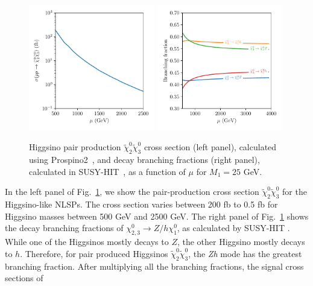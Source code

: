 \documentclass[a4paper,11pt]{article}
\newcommand{\N}{\widetilde{\chi}^0}
\begin{document}
\begin{figure}[h]
  \centering
  \includegraphics[width=0.49\textwidth]{images/xsection_plot.pdf}
  \includegraphics[width=0.49\textwidth]{images/br_plot.pdf}
  \caption{Higgsino pair production $\N_2\N_3$
    cross section (left panel), calculated using
    Prospino2~\cite{Beenakker:1999xh},  and decay branching fractions
    (right panel), calculated in SUSY-HIT~\cite{Djouadi:2006bz},  as a function
    of $\mu$ for $M_1=25$ GeV.
}
  \label{fig:xsection_plot}
\end{figure}

In the left panel of Fig.~\ref{fig:xsection_plot}, we show the pair-production
cross section $\N_2\N_3$ for the Higgsino-like NLSPs.  The cross section varies
between 200 fb to 0.5 fb for Higgsino masses between 500 GeV and 2500 GeV. The
right panel of Fig.~\ref{fig:xsection_plot} shows the decay branching fractions
of $\chi_{2,3}^0\rightarrow Z/h \chi_1^0$, as calculated by SUSY-HIT
\cite{Djouadi:2006bz}.  While one of the Higgsinos mostly decays to $Z$, the
other Higgsino mostly decays to $h$.    Therefore,  for pair produced Higgsinos
$\N_2\N_3$, the \emph{Zh} mode has the greatest branching fraction.  After
multiplying all the branching fractions, the signal cross sections of 
\end{document}
